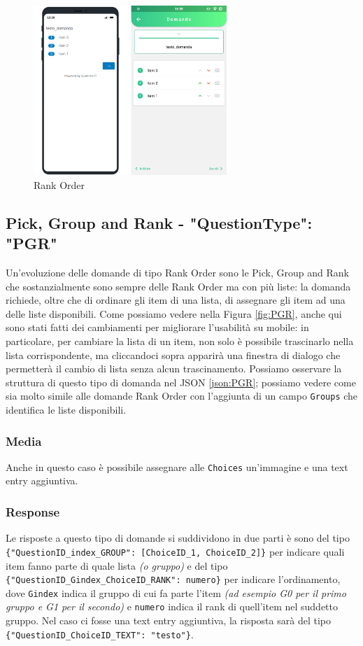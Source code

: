 \begin{figure}[h!]
\centering
\includegraphics[width=0.65\textwidth]{img/rank_order}
\caption{Rank Order}
\label{fig:rank_order}
\end{figure}

\clearpage
\subsection{Pick, Group and Rank - "QuestionType": "PGR"}
Un'evoluzione delle domande di tipo Rank Order sono le Pick, Group and Rank che sostanzialmente sono sempre delle Rank Order ma con più liste: la domanda richiede, oltre che di ordinare gli item di una lista, di assegnare gli item ad una delle liste disponibili. Come possiamo vedere nella Figura \ref{fig:PGR}, anche qui sono stati fatti dei cambiamenti per migliorare l'usabilità su mobile: in particolare, per cambiare la lista di un item, non solo è possibile trascinarlo nella lista corrispondente, ma cliccandoci sopra apparirà una finestra di dialogo che permetterà il cambio di lista senza alcun trascinamento. Possiamo osservare la struttura di questo tipo di domanda nel JSON \ref{json:PGR}; possiamo vedere come sia molto simile alle domande Rank Order con l'aggiunta di un campo \texttt{Groups} che identifica le liste disponibili.

\subsubsection{Media}
Anche in questo caso è possibile assegnare alle \texttt{Choices} un'immagine e una text entry aggiuntiva.

\subsubsection{Response}
Le risposte a questo tipo di domande si suddividono in due parti è sono del tipo \texttt{\{"QuestionID\_index\_GROUP": [ChoiceID\_1, ChoiceID\_2]\}} per indicare quali item fanno parte di quale lista \textit{(o gruppo)} e del tipo \texttt{\{"QuestionID\_Gindex\_ChoiceID\_RANK": numero\}} per indicare l'ordinamento, dove \texttt{Gindex} indica il gruppo di cui fa parte l'item \textit{(ad esempio G0 per il primo gruppo e G1 per il secondo)} e \texttt{numero} indica il rank di quell'item nel suddetto gruppo.
Nel caso ci fosse una text entry aggiuntiva, la risposta sarà del tipo \texttt{\{"QuestionID\_ChoiceID\_TEXT": "testo"\}}.

